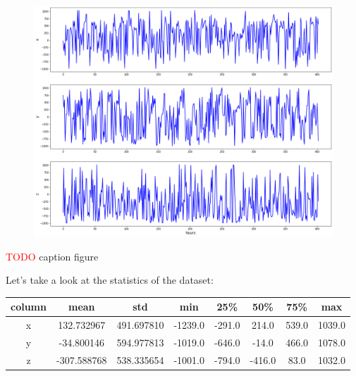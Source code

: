 \begin{figure}[H]
\centering
  \includegraphics[scale=0.3]{img/task_1/data(hour).png}
  \caption{}
  \label{fig: }
\end{figure}

\textcolor{red}{TODO} caption figure

Let's take a look at the statistics of the dataset:

\begin{center}
\begin{tabular}{| c | c | c | c | c | c | c | c |} 
\hline
column & mean & std & min & 25\% & 50\% & 75\% & max \\ [0.5ex] 
\hline
\hline
x & 132.732967 & 491.697810 & -1239.0 & -291.0 & 214.0 & 539.0 & 1039.0 \\
\hline
y & -34.800146 & 594.977813 & -1019.0 & -646.0 & -14.0 & 466.0 & 1078.0 \\
\hline
z & -307.588768 & 538.335654 & -1001.0 & -794.0 & -416.0 & 83.0 & 1032.0 \\ [1ex]
\hline
\end{tabular}
\end{center}


